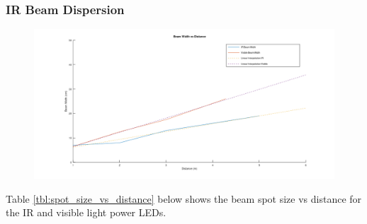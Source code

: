 \subsubsection{IR Beam Dispersion}

\begin{figure}[H]
	\centering
	\includegraphics[width=\linewidth]{figures/results/beam_width_vs_distance.png}
	\label{fig:beam_width_vs_distance}
\end{figure}



Table \ref{tbl:spot_size_vs_distance} below shows the beam spot size vs distance for the IR and visible light power LEDs.


